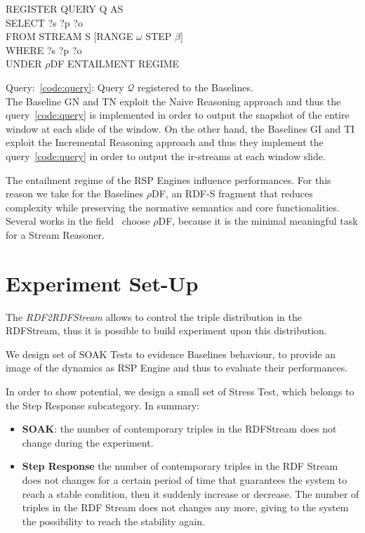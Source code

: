 \begin{center}
\raggedright
\small
REGISTER QUERY Q AS \\
SELECT ?s ?p ?o \\
FROM STREAM S [RANGE $\omega$ STEP $\beta$]\\
WHERE {?s ?p ?o}\\
UNDER $\rho$DF ENTAILMENT REGIME
\label{code:query}

\end{center}
Query:~\ref{code:query}: Query $\mathcal{Q}$ registered to the \name Baselines.\\


The Baseline GN and TN exploit the Naive Reasoning approach and thus the query~\ref{code:query} is implemented in order to output the snapshot of the entire window at each slide of the window. On the other hand, the Baselines GI and TI exploit the Incremental Reasoning approach and thus they implement the query~\ref{code:query} in order to output the ir-streams at each window slide.

The entailment regime of the RSP Engines influence performances. For this reason we take for the Baselines $\rho$DF, an RDF-S fragment that reduces complexity while preserving the normative semantics and core functionalities.~\cite{DBLP:conf/esws/MunozPG07}  Several works in the field~\cite{DBLP:conf/semweb/UrbaniMJHB13, Liu:2014:ERS:2567948.2577323} choose $\rho$DF, because it is the minimal meaningful task for a Stream Reasoner.

\section{Experiment Set-Up}\label{sec:experiment-setup}

The \textit{RDF2RDFStream} allows to control the triple distribution in the RDFStream, thus it is possible to build experiment upon this distribution. 

We design set of SOAK Tests to evidence Baselines behaviour, to provide an image of the dynamics as RSP Engine  and thus to evaluate their performances. 

In order to show \name potential, we design a small set of Stress Test, which belongs to the Step Response subcategory. In summary:

\begin{itemize}
\item \textbf{SOAK}: the number of contemporary triples in the RDFStream does not change during the experiment.
\item \textbf{Step Response} the number of contemporary triples in the RDF Stream does not changes for a certain period of time that guarantees the system to reach a stable condition, then it suddenly increase or decrease. The number of triples in the RDF Stream does not changes any more, giving to the system the possibility to reach the stability again.
\end{itemize}

